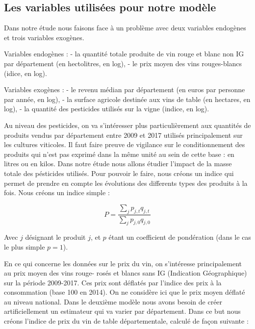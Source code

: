 \documentclass[11pt,]{article}
\begin{document}
\hypertarget{les-variables-utilisees-pour-notre-modele}{%
\subsection{Les variables utilisées pour notre
modèle}\label{les-variables-utilisees-pour-notre-modele}}

Dans notre étude nous faisons face à un problème avec deux variables
endogènes et trois variables exogènes.

Variables endogènes : - la quantité totale produite de vin rouge et
blanc non IG par département (en hectolitres, en log), - le prix moyen
des vins rouges-blancs (idice, en log).

Variables exogènes : - le revenu médian par département (en euros par
personne par année, en log), - la surface agricole destinée aux vins de
table (en hectares, en log), - la quantité des pesticides utilisés sur
la vigne (indice, en log).

Au niveau des pesticides, on va s'intéresser plus particulièrement aux
quantités de produits vendus par département entre 2009 et 2017 utilisés
principalement sur les cultures viticoles. Il faut faire preuve de
vigilance sur le conditionnement des produits qui n'est pas exprimé dans
la même unité au sein de cette base : en litres ou en kilos. Dans notre
étude nous allons étudier l'impact de la masse totale des pésticides
utilisés. Pour pouvoir le faire, nous créons un indice qui permet de
prendre en compte les évolutions des differents types des produits à la
fois. Nous créons un indice simple :

\begin{equation*}
  P = \frac{\sum_j p_{j, t} q_{j, t}}{\sum_j p_{j, 0} q_{j, 0}}
\end{equation*}

Avec \(j\) désignant le produit \(j\), et \(p\) étant un coefficient de
pondération (dans le cas le plus simple \(p = 1\)).

En ce qui concerne les données sur le prix du vin, on s'intéresse
principalement au prix moyen des vins rouge- rosés et blancs sans IG
(Indication Géographique) sur la période 2009-2017. Ces prix sont
déflatés par l'indice des prix à la consommation (base 100 en 2014). On
ne considère ici que le prix moyen déflaté au niveau national. Dans le
deuxième modèle nous avons besoin de créer artificiellement un
estimateur qui va varier par département. Dans ce but nous créons
l'indice de prix du vin de table départementale, calculé de façon
suivante :
\end{document}
